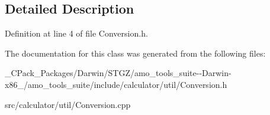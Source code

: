 \subsection{Detailed Description}


Definition at line 4 of file Conversion.\+h.



The documentation for this class was generated from the following files\+:\begin{DoxyCompactItemize}
\item 
\+\_\+\+C\+Pack\+\_\+\+Packages/\+Darwin/\+S\+T\+G\+Z/amo\+\_\+tools\+\_\+suite-\/-\/\+Darwin-\/x86\+\_/amo\+\_\+tools\+\_\+suite/include/calculator/util/Conversion.\+h\item 
src/calculator/util/Conversion.\+cpp\end{DoxyCompactItemize}
